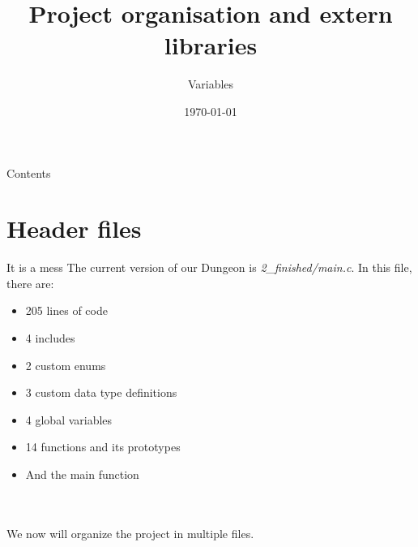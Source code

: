 


\title{Project organisation and extern libraries}
\subtitle{Variables}
\date{\today}





\maketitle

\begin{frame}{Contents}
	\tableofcontents
\end{frame}
\section{Header files}

\begin{frame}{It is a mess}
	The current version of our Dungeon is \textit{2\_finished/main.c}. In this file, there are:
	\begin{itemize}
		\item 205 lines of code
		\item 4 includes
		\item 2 custom enums
		\item 3 custom data type definitions
		\item 4 global variables
		\item 14 functions and its prototypes
		\item And the main function
	\end{itemize}\ \\\ \\
	We now will organize the project in multiple files.
\end{frame}



